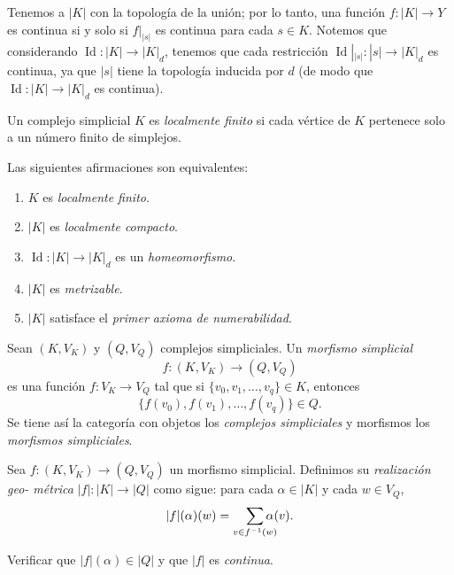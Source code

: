 
Tenemos a $|K|$ con la topología de la unión; por lo tanto, una función $f \colon |K| \to Y$ es continua si y solo si $f|_{|s|}$ es continua para cada $s \in K$. Notemos que considerando $\operatorname{Id} \colon |K| \to |K|_d$, tenemos que cada restricción $\operatorname{Id}|_{|s|} \colon |s| \to |K|_d$ es continua, ya que $|s|$ tiene la topología inducida por $d$ (de modo que $\operatorname{Id} \colon |K| \to |K|_d$ es continua).

\begin{definicion}
Un complejo simplicial $K$ es \textit{localmente finito} si cada vértice de $K$ pertenece solo a un número finito de simplejos.
\end{definicion}

\begin{prop}
Las siguientes afirmaciones son equivalentes:
\begin{enumerate}
    \item $K$ es \textit{localmente finito}.
    \item $|K|$ es \textit{localmente compacto}.
    \item $\operatorname{Id} \colon |K| \to |K|_d$ es un \textit{homeomorfismo}.
    \item $|K|$ es \textit{metrizable}.
    \item $|K|$ satisface el \textit{primer axioma de numerabilidad}.
\end{enumerate}
\end{prop}

\begin{definicion}
Sean $(K, V_K)$ y $(Q, V_Q)$ complejos simpliciales. Un \textit{morfismo simplicial}
\[
f \colon (K, V_K) \longrightarrow (Q, V_Q)
\]
es una función $f \colon V_K \to V_Q$ tal que si $\{v_0, v_1, \dots, v_q\} \in K$, entonces
\[
\big\{ f(v_0), f(v_1), \dots, f(v_q) \big\} \in Q.
\]
Se tiene así la categoría con objetos los \textit{complejos simpliciales} y morfismos los \textit{morfismos simpliciales}.
\end{definicion}
\begin{definicion}
Sea $f \colon (K, V_K) \to (Q, V_Q)$ un morfismo simplicial. Definimos su \textit{realización geo- métrica} $|f| \colon |K| \to |Q|$ como sigue: para cada $\alpha \in |K|$ y cada $w \in V_Q$,
\[
|f|(\alpha)(w) =\smashoperator[r]{\sum_{v \in f^{-1}(w)}} \alpha(v).
\]
\end{definicion}

\begin{ejercicio}
Verificar que $|f|(\alpha) \in |Q|$ y que $|f|$ es \textit{continua}.
\end{ejercicio}

